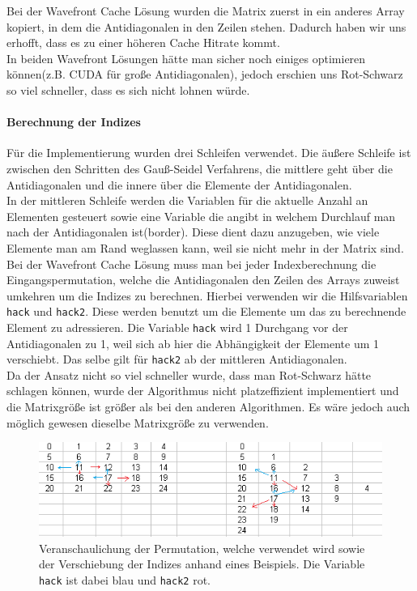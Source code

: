 \documentclass{article}
\begin{document}
Bei der Wavefront Cache Lösung wurden die Matrix zuerst in ein anderes Array kopiert, in dem die Antidiagonalen in den Zeilen stehen. Dadurch haben wir uns erhofft, dass es zu einer höheren Cache Hitrate kommt. \\
In beiden Wavefront Lösungen hätte man sicher noch einiges optimieren können(z.B. CUDA für große Antidiagonalen), jedoch erschien uns Rot-Schwarz so viel schneller, dass es sich nicht lohnen würde.

\paragraph{Berechnung der Indizes}
Für die Implementierung wurden drei Schleifen verwendet. Die äußere Schleife ist zwischen den Schritten des Gauß-Seidel Verfahrens, die mittlere geht über die Antidiagonalen und die innere über die Elemente der Antidiagonalen. \\
In der mittleren Schleife werden die Variablen für die aktuelle Anzahl an Elementen gesteuert sowie eine Variable die angibt in welchem Durchlauf man nach der Antidiagonalen ist(border). Diese dient dazu anzugeben, wie viele Elemente man am Rand weglassen kann, weil sie nicht mehr in der Matrix sind.\\
Bei der Wavefront Cache Lösung muss man bei jeder Indexberechnung die Eingangspermutation, welche die Antidiagonalen den Zeilen des Arrays zuweist umkehren um die Indizes zu berechnen. Hierbei verwenden wir die Hilfsvariablen \texttt{hack} und \texttt{hack2}. Diese werden benutzt um die Elemente um das zu berechnende Element zu adressieren. Die Variable \texttt{hack} wird 1 Durchgang vor der Antidiagonalen zu 1, weil sich ab hier die Abhängigkeit der Elemente um 1 verschiebt. Das selbe gilt für \texttt{hack2} ab der mittleren Antidiagonalen. \\
Da der Ansatz nicht so viel schneller wurde, dass man Rot-Schwarz hätte schlagen können, wurde der Algorithmus nicht platzeffizient implementiert und die Matrixgröße ist größer als bei den anderen Algorithmen. Es wäre jedoch auch möglich gewesen dieselbe Matrixgröße zu verwenden.

\begin{figure}[htbp] 
  \centering
     \includegraphics[width=1\textwidth]{bilder/hack.png}
  \caption{Veranschaulichung der Permutation, welche verwendet wird sowie der Verschiebung der Indizes anhand eines Beispiels. Die Variable \texttt{hack} ist dabei blau und \texttt{hack2} rot.}
  \label{fig:Bild6}
\end{figure}
\end{document}
